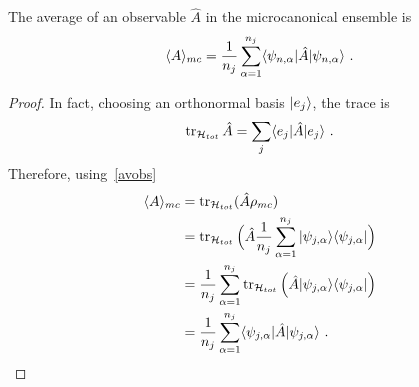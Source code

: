     The average of an observable $\hat A$ in the microcanonical ensemble is 
    \begin{equation*}
        \langle A\rangle_{mc} = \frac{1}{n_j} \sum_{\alpha=1}^{n_j} \langle\psi_{n,\alpha}\vert \hat A \vert\psi_{n,\alpha}\rangle ~.
    \end{equation*}
    \begin{proof}
        In fact, choosing an orthonormal basis $\vert e_j\rangle$, the trace is 
        \begin{equation*}
            \operatorname{tr}_{\mathcal H_{tot}} \hat A = \sum_j \langle e_j\vert \hat A \vert e_j\rangle ~.
        \end{equation*}
        Therefore, using~\eqref{avobs}
        \begin{equation*}
        \begin{aligned}
            \langle A\rangle_{mc} & = \operatorname{tr}_{\mathcal H_{tot}} (\hat A \rho_{mc}) \\ & = \operatorname{tr}_{\mathcal H_{tot}} \Big ( \hat A \frac{1}{n_j} \sum_{\alpha=1}^{n_j} \vert\psi_{j, \alpha}\rangle \langle\psi_{j, \alpha}\vert \Big) \\ & = \frac{1}{n_j} \sum_{\alpha=1}^{n_j} \operatorname{tr}_{\mathcal H_{tot}} \Big ( \hat A \vert\psi_{j, \alpha}\rangle \langle\psi_{j, \alpha}\vert \Big) \\ & = \frac{1}{n_j} \sum_{\alpha=1}^{n_j} \langle\psi_{j, \alpha}\vert \hat A \vert\psi_{j, \alpha}\rangle ~.
        \end{aligned}
        \end{equation*}
    \end{proof}

